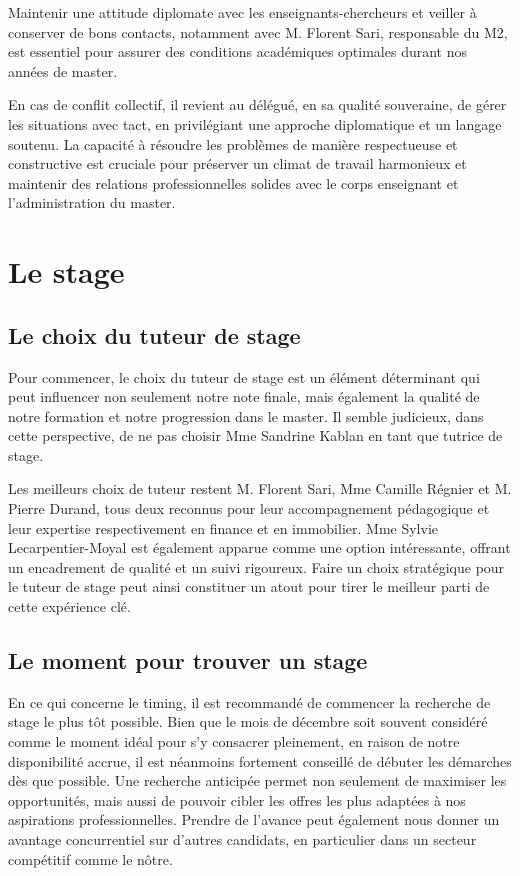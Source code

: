 \documentclass[a4paper, 12pt]{report}
\begin{document}
Maintenir une attitude diplomate avec les enseignants-chercheurs et veiller à conserver de bons contacts, notamment avec M. Florent Sari, responsable du M2, est essentiel pour assurer des conditions académiques optimales durant nos années de master.

En cas de conflit collectif, il revient au délégué, en sa qualité souveraine, de gérer les situations avec tact, en privilégiant une approche diplomatique et un langage soutenu. La capacité à résoudre les problèmes de manière respectueuse et constructive est cruciale pour préserver un climat de travail harmonieux et maintenir des relations professionnelles solides avec le corps enseignant et l’administration du master.

\chapter{Le stage}

\section{Le choix du tuteur de stage}

Pour commencer, le choix du tuteur de stage est un élément déterminant qui peut influencer non seulement notre note finale, mais également la qualité de notre formation et notre progression dans le master. Il semble judicieux, dans cette perspective, de ne pas choisir Mme Sandrine Kablan en tant que tutrice de stage.

Les meilleurs choix de tuteur restent M. Florent Sari, Mme Camille Régnier et M. Pierre Durand, tous deux reconnus pour leur accompagnement pédagogique et leur expertise respectivement en finance et en immobilier. Mme Sylvie Lecarpentier-Moyal est également apparue comme une option intéressante, offrant un encadrement de qualité et un suivi rigoureux. Faire un choix stratégique pour le tuteur de stage peut ainsi constituer un atout pour tirer le meilleur parti de cette expérience clé.

\section{Le moment pour trouver un stage}

En ce qui concerne le timing, il est recommandé de commencer la recherche de stage le plus tôt possible. Bien que le mois de décembre soit souvent considéré comme le moment idéal pour s’y consacrer pleinement, en raison de notre disponibilité accrue, il est néanmoins fortement conseillé de débuter les démarches dès que possible. Une recherche anticipée permet non seulement de maximiser les opportunités, mais aussi de pouvoir cibler les offres les plus adaptées à nos aspirations professionnelles. Prendre de l’avance peut également nous donner un avantage concurrentiel sur d’autres candidats, en particulier dans un secteur compétitif comme le nôtre. 
\end{document}
